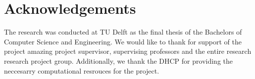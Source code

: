 \section{Acknowledgements}
\label{sec:acknowledgements}

The research was conducted at TU Delft as the final thesis of the Bachelors of Computer Science and Engineering. We would like to thank for support of the project amazing project supervisor, supervising professors and the entire research research project group. Additionally, we thank the DHCP \cite{DHPC2024} for providing the neccesarry computational resrouces for the project.